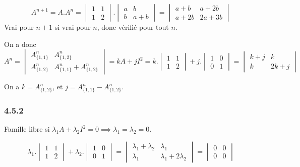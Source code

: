 \documentclass[]{book}
\theoremstyle{definition}
\begin{document}
$$A^{n+1} = A.A^n = \begin{vmatrix} 1 & 1 \\ 1 & 2 \end{vmatrix} . 
\begin{vmatrix} a & b \\ b & a+b \end{vmatrix} = 
\begin{vmatrix} a+b & a+2b \\ a+2b & 2a+3b \end{vmatrix}
$$
Vrai pour $n+1$ si vrai pour $n$, donc v\'erifi\'e pour tout $n$.

On a donc
$$A^{n} = \begin{vmatrix} A^n_{\{1,1\}} & A^n_{\{1,2\}} \\ A^n_{\{1,2\}} & A^n_{\{1,1\}} + A^n_{\{1,2\}} \end{vmatrix} = kA + jI^2 = 
k . \begin{vmatrix} 1 & 1 \\ 1 & 2 \end{vmatrix} + 
j . \begin{vmatrix} 1 & 0 \\ 0 & 1 \end{vmatrix} =
\begin{vmatrix} k+j & k \\ k & 2k+j \end{vmatrix}
$$

On a $k = A^n_{\{1,2\}}$, et $j = A^n_{\{1,1\}} - A^n_{\{1,2\}}$.

\subsubsection*{4.5.2}
Famille libre si $\lambda_1 A + \lambda_2 I^2 = 0 \implies \lambda_1 = \lambda_2 = 0$.

$$\lambda_1.\begin{vmatrix} 1 & 1 \\ 1 & 2 \end{vmatrix} + 
\lambda_2.\begin{vmatrix} 1 & 0 \\ 0 & 1 \end{vmatrix} = 
\begin{vmatrix} \lambda_1+\lambda_2 & \lambda_1 \\ \lambda_1 & \lambda_1+2\lambda_2 \end{vmatrix} = \begin{vmatrix} 0 & 0 \\ 0 & 0 \end{vmatrix}
$$
\end{document}
